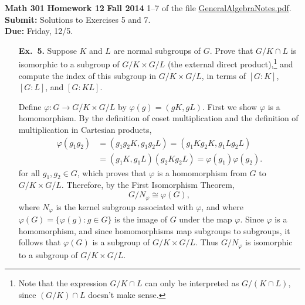 \documentclass[12pt,reqno]{amsart}
\newcommand{\<}{\ensuremath{\langle}}
\renewcommand{\>}{\ensuremath{\rangle}}
\begin{document}
\thispagestyle{empty}

\noindent \textbf{Math 301} \hskip5cm {\bf Homework 12} \hfill {\bf Fall 2014}
\vskip1cm
 1--7 of the file
\href{https://github.com/williamdemeo/Math301-Fall2014/blob/master/misc/GeneralAlgebraNotes.pdf?raw=true}{GeneralAlgebraNotes.pdf}. {\bf
  Submit:}  Solutions to Exercises 5 and 7.
\\
{\bf Due:} Friday, 12/5.

\medskip

\begin{enumerate}
\item[{\bf Ex.~5.}] 
    Suppose $K$ and $L$ are normal subgroups of $G$. Prove that $G/K\cap L$ is
    isomorphic to a subgroup of $G/K \times G/L$ (the external direct
    product),\footnote{Note 
      that the expression $G/K\cap L$ can only be interpreted as $G/(K\cap L)$,
      since $(G/K)\cap L$ doesn't make sense.} and compute the index
    of this subgroup in $G/K \times G/L$, 
    in terms of $[G:K]$, $[G:L]$, and $[G:KL]$.

\medskip
\newcommand\GKGL{\ensuremath{G/K \times G/L}}

Define $\varphi: G \rightarrow G/K \times G/L$ by $\varphi(g) = (gK, gL)$.
First we show $\varphi$ is a homomorphism. By the definition of coset
multiplication and the definition of multiplication in Cartesian
products,
\begin{align*}
\varphi(g_1 g_2) &= 
(g_1 g_2K,g_1 g_2L) = (g_1 Kg_2K,g_1 Lg_2L)\\
 &= (g_1 K,g_1L) (g_2K g_2L) = \varphi(g_1)\varphi(g_2).
\end{align*}
for all $g_1, g_2 \in G$, which proves that $\varphi$ is a homomorphism
from $G$ to $\GKGL$.
Therefore, by the First Isomorphism Theorem, 
\[
G/N_\varphi \cong \varphi(G),
\] 
where $N_\varphi$ is the kernel subgroup associated with $\varphi$, and 
where $\varphi(G) = \{ \varphi(g) : g\in G\}$ is the image of $G$ under the map
$\varphi$. Since $\varphi$ is a homomorphism, and since homomorphisms map
subgroups to subgroups, it follows that 
$\varphi(G)$ is a subgroup of $\GKGL$. 
Thus $G/N_\varphi$ is isomorphic to a subgroup of $\GKGL$. 


\end{enumerate}
\end{document}
